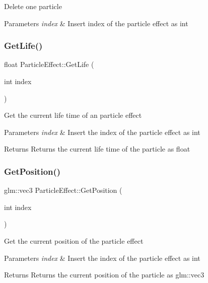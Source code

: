 Delete one particle 
\begin{DoxyParams}{Parameters}
{\em index} & Insert index of the particle effect as int \\
\hline
\end{DoxyParams}
\mbox{\label{class_particle_effect_ade096976cbd5c1437130d90199866d73}} 
\subsubsection{\texorpdfstring{GetLife()}{GetLife()}}
{\footnotesize\ttfamily float Particle\+Effect\+::\+Get\+Life (\begin{DoxyParamCaption}\item[{int}]{index }\end{DoxyParamCaption})}

Get the current life time of an particle effect 
\begin{DoxyParams}{Parameters}
{\em index} & Insert the index of the particle effect as int \\
\hline
\end{DoxyParams}
\begin{DoxyReturn}{Returns}
Returns the current life time of the particle as float 
\end{DoxyReturn}
\mbox{\label{class_particle_effect_a0bf5361cc63c5aa468159a05ca44e8d7}} 
\subsubsection{\texorpdfstring{GetPosition()}{GetPosition()}}
{\footnotesize\ttfamily glm\+::vec3 Particle\+Effect\+::\+Get\+Position (\begin{DoxyParamCaption}\item[{int}]{index }\end{DoxyParamCaption})}

Get the current position of the particle effect 
\begin{DoxyParams}{Parameters}
{\em index} & Insert the index of the particle effect as int \\
\hline
\end{DoxyParams}
\begin{DoxyReturn}{Returns}
Returns the current position of the particle as glm\+::vec3 
\end{DoxyReturn}
\mbox{\label{class_particle_effect_a08a4f5412f722d8f6234c5315128d6f3}} 

